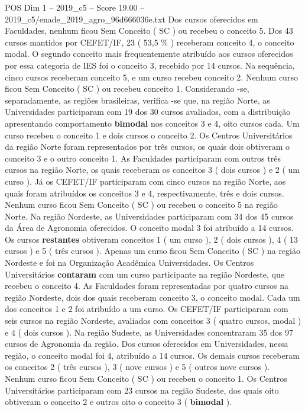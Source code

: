 \begin{textsample}{POS Dim 1 – 2019\_c5 – Score 19.00 – 2019\_c5/enade\_2019\_agro\_96d666036e.txt}
Dos cursos oferecidos em Faculdades, nenhum ficou Sem Conceito ( SC ) ou recebeu o conceito 5.
Dos 43 cursos mantidos por CEFET/IF, 23 ( 53,5 \% ) receberam conceito 4, o conceito modal.
O segundo conceito mais frequentemente atribuído aos cursos oferecidos por essa categoria de IES foi o conceito 3, recebido por 14 cursos.
Na sequência, cinco cursos receberam conceito 5, e um curso recebeu conceito 2.
Nenhum curso ficou Sem Conceito ( SC ) ou recebeu conceito 1.
Considerando -se, separadamente, as regiões brasileiras, verifica -se que, na região Norte, as Universidades participaram com 19 dos 30 cursos avaliados, com a distribuição apresentando comportamento \textbf{bimodal} nos conceitos 3 e 4, oito cursos cada.
Um curso recebeu o conceito 1 e dois cursos o conceito 2.
Os Centros Universitários da região Norte foram representados por três cursos, os quais dois obtiveram o conceito 3 e o outro conceito 1.
As Faculdades participaram com outros três cursos na região Norte, os quais receberam os conceitos 3 ( dois cursos ) e 2 ( um curso ).
Já os CEFET/IF participaram com cinco cursos na região Norte, aos quais foram atribuídos os conceitos 3 e 4, respectivamente, três e dois cursos.
Nenhum curso ficou Sem Conceito ( SC ) ou recebeu o conceito 5 na região Norte.
Na região Nordeste, as Universidades participaram com 34 dos 45 cursos da Área de Agronomia oferecidos.
O conceito modal 3 foi atribuído a 14 cursos.
Os cursos \textbf{restantes} obtiveram conceitos 1 ( um curso ), 2 ( dois cursos ), 4 ( 13 cursos ) e 5 ( três cursos ).
Apenas um curso ficou Sem Conceito ( SC ) na região Nordeste e foi na Organização Acadêmica Universidades.
Os Centros Universitários \textbf{contaram} com um curso participante na região Nordeste, que recebeu o conceito 4.
As Faculdades foram representadas por quatro cursos na região Nordeste, dois dos quais receberam conceito 3, o conceito modal.
Cada um dos conceitos 1 e 2 foi atribuído a um curso.
Os CEFET/IF participaram com seis cursos na região Nordeste, avaliados com conceitos 3 ( quatro cursos, modal ) e 4 ( dois cursos ).
Na região Sudeste, as Universidades concentraram 35 dos 97 cursos de Agronomia da região.
Dos cursos oferecidos em Universidades, nessa região, o conceito modal foi 4, atribuído a 14 cursos.
Os demais cursos receberam os conceitos 2 ( três cursos ), 3 ( nove cursos ) e 5 ( outros nove cursos ).
Nenhum curso ficou Sem Conceito ( SC ) ou recebeu o conceito 1.
Os Centros Universitários participaram com 23 cursos na região Sudeste, dos quais oito obtiveram o conceito 2 e outros oito o conceito 3 ( \textbf{bimodal} ).

\end{textsample}
